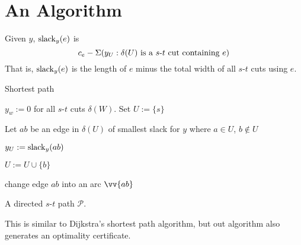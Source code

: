 \section{An Algorithm}
Given $ y $, $\operatorname{slack}_{y} (e)$ is
\[ c_e-\Sigma(y_U :\delta(U) \text{ is a $s$-$t$ cut containing $ e $}) \]
That is, $ \operatorname{slack}_y(e) $ is the length of $ e $ minus the total width of all
$s$-$t$ cuts using $ e $.


\begin{algbox}
    \begin{algorithm}[H]
        \caption{Shortest path}
        $ y_w := 0 $ for all $s$-$t$ cuts $ \delta(W) $. Set $ U:=\{s\} $
    
         {
            Let $ ab $ be an edge in $ \delta(U) $ of smallest slack for $ y $
            where $ a\in U $, $ b\notin U $
    
            $ y_U:=\operatorname{slack}_y(ab) $
    
            $ U:=U\cup \{b\} $
    
            change edge $ ab $ into an arc $ \vv{ab} $
        }
    
        \Return A directed $s$-$t$ path $ \mathcal{P} $.
    \end{algorithm}
\end{algbox}

This is similar to Dijkstra's shortest path algorithm, but out algorithm
also generates an optimality certificate.